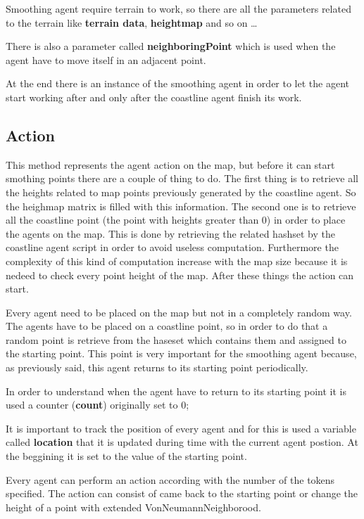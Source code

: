 \documentclass[12pt]{article}
\begin{document}
    \noindent 
    Smoothing agent require terrain to work, so there are all the parameters related to the terrain like \textbf{terrain data}, \textbf{heightmap} and so on \dots

    \noindent
    There is also a parameter called \textbf{neighboringPoint} which is used when the agent have to move itself in an adjacent point.
    
    \noindent
    At the end there is an instance of the smoothing agent in order to let the agent start working after and only after the coastline agent finish its work.

    \subsection{Action}
    This method represents the agent action on the map, but before it can start smothing points there are a couple of thing to do.
    The first thing is to retrieve all the heights related to map points previously generated by the coastline agent. So the heighmap matrix is filled with this information.
    The second one is to retrieve all the coastline point (the point with heights greater than 0) in order to place the agents on the map. This is done by retrieving the
    related hashset by the coastline agent script in order to avoid useless computation. Furthermore the complexity of this kind of computation increase with the map size 
    because it is nedeed to check every point height of the map.
    After these things the action can start.

    Every agent need to be placed on the map but not in a completely random way. The agents have to be placed on a coastline point, so in order to do that a random point is retrieve
    from the haseset which contains them and assigned to the starting point. This point is very important for the smoothing agent because, as previously said, this agent returns
    to its starting point periodically.

    In order to understand when the agent have to return to its starting point it is used a counter (\textbf{count}) originally set to 0;
    
    It is important to track the position of every agent and for this is used a variable called \textbf{location} that it is updated during time with the current agent postion. 
    At the beggining it is set to the value of the starting point.

    Every agent can perform an action according with the number of the tokens specified. The action can consist of came back to the starting point or change the height of a point
    with extended VonNeumannNeighborood.
\end{document}
